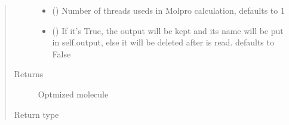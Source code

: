 \documentclass[letterpaper,10pt,english]{sphinxmanual}
\begin{document}
\begin{fulllineitems}
\begin{quote}
\begin{description}
\begin{itemize}
\item {} 
\sphinxAtStartPar
{} (\sphinxstyleliteralemphasis{\sphinxupquote{, }}) \textendash{} Number of threads useds in Molpro calculation, defaults to 1

\item {} 
\sphinxAtStartPar
{} (\sphinxstyleliteralemphasis{\sphinxupquote{, }}) \textendash{} If it’s True, the output will be kept and its name will be put in self.output, else it will be
deleted after is read. defaults to False

\end{itemize}

\item[{Returns}] \leavevmode
\sphinxAtStartPar
Optmized molecule

\item[{Return type}] \leavevmode
\sphinxAtStartPar
{\hyperref[\detokenize{molecular:molecular.Molecule}]{}}

\end{description}\end{quote}

\end{fulllineitems}

\end{document}
